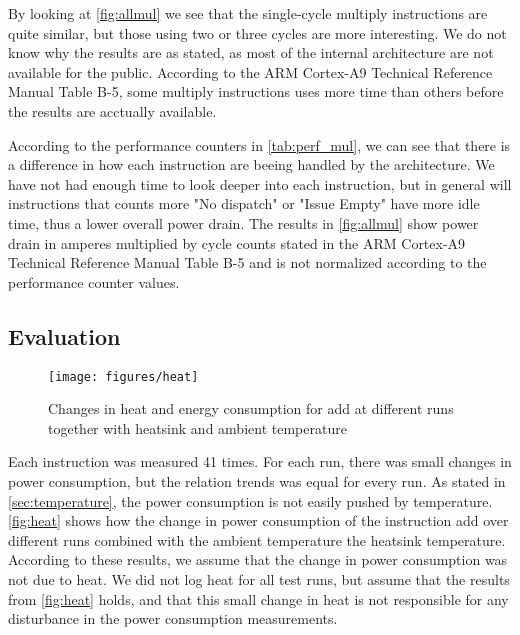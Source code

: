 By looking at \autoref{fig:allmul} we see that the single-cycle multiply
instructions are quite similar, but those using two or three cycles are more
interesting. We do not know why the results are as stated, as most of the
internal architecture are not available for the public. According to the ARM
Cortex-A9 Technical Reference Manual Table B-5, some multiply instructions uses
more time than others before the results are acctually available\cite{armtech}.

According to the performance counters in \autoref{tab:perf_mul}, we can see that there is a difference in how each
instruction are beeing handled by the architecture. We have not had enough time to look deeper into each instruction,
but in general will instructions that counts more "No dispatch" or "Issue Empty" have more idle time, thus a lower
overall power drain. The results in \autoref{fig:allmul} show power drain in amperes multiplied by cycle counts stated in the ARM
Cortex-A9 Technical Reference Manual Table B-5\cite{armtech} and is not normalized according to the performance counter values.

\subsection{Evaluation}
\begin{figure}
    \centering
    \texttt{[image: figures/heat]}
    \caption{Changes in heat and energy consumption for {\ttfamily add} at different runs together with heatsink and ambient temperature}
    \label{fig:heat}
\end{figure}

Each instruction was measured 41 times. For each run, there was small changes in
power consumption, but the relation trends was equal for every run.
As stated in \autoref{sec:temperature}, the power consumption is not easily pushed by temperature. \autoref{fig:heat} shows how the change in power consumption of the instruction
{\ttfamily add} over different runs combined with the ambient temperature the
heatsink temperature. According to these results, we assume that the change in
power consumption was not due to heat. We did not log heat for all test runs,
but assume that the results from \autoref{fig:heat} holds, and that this small
change in heat is not responsible for any disturbance in the power consumption
measurements.


